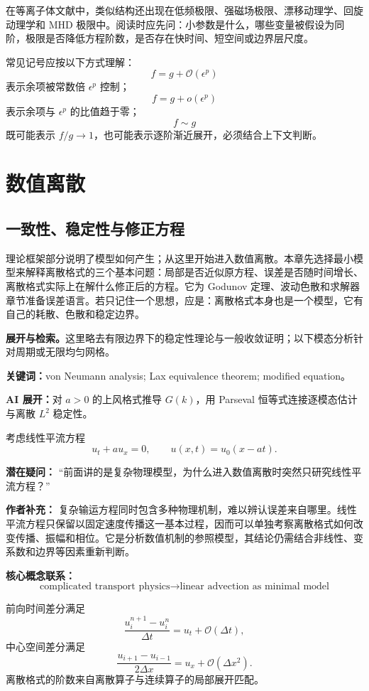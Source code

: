 \documentclass[11pt,openany]{ctexbook}
\newcommand{\Order}{\mathcal O}
\newcommand{\studyroute}[3]{%
  \par\smallskip\noindent\textbf{展开与检索。}#1\par
  \noindent\textbf{关键词：}#2。\par
  \noindent\textbf{AI 展开：}#3\par
}
\begin{document}
在等离子体文献中，类似结构还出现在低频极限、强磁场极限、漂移动理学、回旋动理学和 MHD 极限中。阅读时应先问：小参数是什么，哪些变量被假设为同阶，极限是否降低方程阶数，是否存在快时间、短空间或边界层尺度。

常见记号应按以下方式理解：
\[
f=g+\Order(\epsilon^p)
\]
表示余项被常数倍 \(\epsilon^p\) 控制；
\[
f=g+o(\epsilon^p)
\]
表示余项与 \(\epsilon^p\) 的比值趋于零；
\[
f\sim g
\]
既可能表示 \(f/g\to1\)，也可能表示逐阶渐近展开，必须结合上下文判断。

\part{数值离散}

\chapter{一致性、稳定性与修正方程}

\begin{chaptersummary}
理论框架部分说明了模型如何产生；从这里开始进入数值离散。本章先选择最小模型来解释离散格式的三个基本问题：局部是否近似原方程、误差是否随时间增长、离散格式实际上在解什么修正后的方程。它为 Godunov 定理、波动色散和求解器章节准备误差语言。若只记住一个思想，应是：离散格式本身也是一个模型，它有自己的耗散、色散和稳定边界。
\end{chaptersummary}
\studyroute{这里略去有限边界下的稳定性理论与一般收敛证明；以下模态分析针对周期或无限均匀网格。}{von Neumann analysis; Lax equivalence theorem; modified equation}{对 $a>0$ 的上风格式推导 $G(k)$，用 Parseval 恒等式连接逐模态估计与离散 $L^2$ 稳定性。}

考虑线性平流方程
\[
u_t+au_x=0,
\qquad
u(x,t)=u_0(x-at).
\]

\begin{authornote}
\textbf{潜在疑问：}
“前面讲的是复杂物理模型，为什么进入数值离散时突然只研究线性平流方程？”

\textbf{作者补充：}
复杂输运方程同时包含多种物理机制，难以辨认误差来自哪里。线性平流方程只保留以固定速度传播这一基本过程，因而可以单独考察离散格式如何改变传播、振幅和相位。它是分析数值机制的参照模型，其结论仍需结合非线性、变系数和边界等因素重新判断。

\textbf{核心概念联系：}
\[
\text{complicated transport physics}
\longrightarrow
\text{linear advection as minimal model}
\]
\end{authornote}

前向时间差分满足
\[
\frac{u_i^{n+1}-u_i^n}{\Delta t}
=
u_t+\Order(\Delta t),
\]
中心空间差分满足
\[
\frac{u_{i+1}-u_{i-1}}{2\Delta x}
=
u_x+\Order(\Delta x^2).
\]
离散格式的阶数来自离散算子与连续算子的局部展开匹配。
\end{document}
